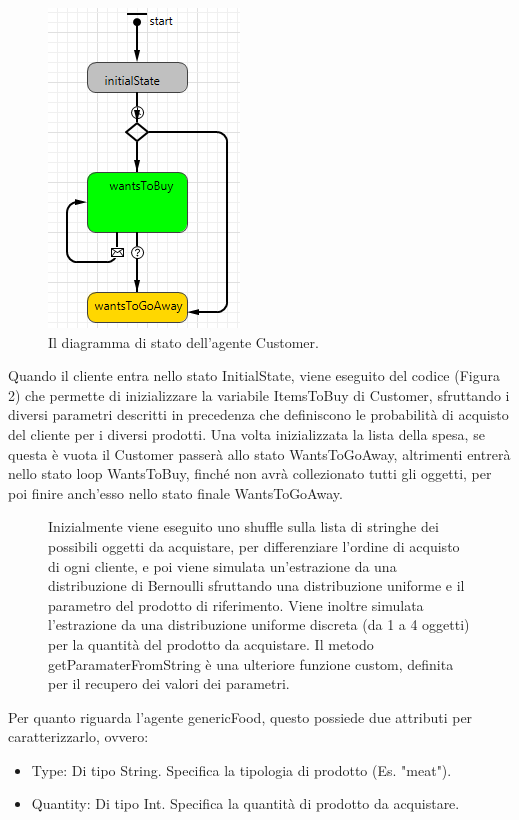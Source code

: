 \documentclass{article}
\begin{document}
\begin{center}
\begin{figure}[h]
\center
\label{statechart}
\includegraphics[scale=0.47]{./statechart.png}
\caption{\footnotesize{Il diagramma di stato dell'agente Customer.}}
\end{figure}
\end{center}
Quando il cliente entra nello stato InitialState, viene eseguito del codice (Figura 2) che permette di inizializzare la variabile ItemsToBuy di Customer, sfruttando i diversi parametri descritti in precedenza che definiscono le probabilità di acquisto del cliente per i diversi prodotti.
\newline
\newline
Una volta inizializzata la lista della spesa, se questa è vuota il Customer passerà allo stato WantsToGoAway, altrimenti entrerà nello stato loop WantsToBuy, finché non avrà collezionato tutti gli oggetti, per poi finire anch'esso nello stato finale WantsToGoAway.
\begin{center}
\begin{figure}[h]
\label{init}

\caption{\footnotesize{Inizialmente viene eseguito uno shuffle sulla lista di stringhe dei possibili oggetti da acquistare, per differenziare l'ordine di acquisto di ogni cliente, e poi viene simulata un'estrazione da una distribuzione di Bernoulli sfruttando una distribuzione uniforme e il parametro del prodotto di riferimento. Viene inoltre simulata l'estrazione da una distribuzione uniforme discreta (da 1 a 4 oggetti) per la quantità del prodotto da acquistare. Il metodo \textsf{getParamaterFromString} è una ulteriore funzione custom, definita per il recupero dei valori dei parametri.}}
\end{figure}
\end{center}
Per quanto riguarda l'agente \textsf{genericFood}, questo possiede due attributi per caratterizzarlo, ovvero:
\begin{itemize}
\item \textsf{Type}: Di tipo String. Specifica la tipologia di prodotto (Es. "meat").
\item \textsf{Quantity}: Di tipo Int. Specifica la quantità di prodotto da acquistare.
\end{itemize}
\end{document}
